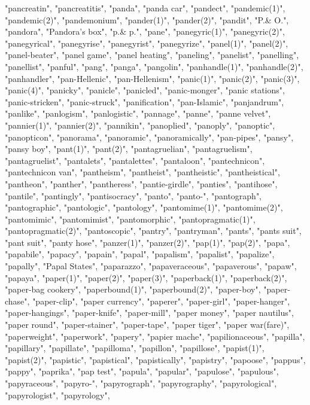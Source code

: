 "pancreatin",
"pancreatitis",
"panda",
"panda car",
"pandect",
"pandemic(1)",
"pandemic(2)",
"pandemonium",
"pander(1)",
"pander(2)",
"pandit",
"P.\& O.",
"pandora",
"Pandora's box",
"p.\& p.",
"pane",
"panegyric(1)",
"panegyric(2)",
"panegyrical",
"panegyrise",
"panegyrist",
"panegyrize",
"panel(1)",
"panel(2)",
"panel-beater",
"panel game",
"panel heating",
"paneling",
"panelist",
"panelling",
"panellist",
"panful",
"pang",
"panga",
"pangolin",
"panhandle(1)",
"panhandle(2)",
"panhandler",
"pan-Hellenic",
"pan-Hellenism",
"panic(1)",
"panic(2)",
"panic(3)",
"panic(4)",
"panicky",
"panicle",
"panicled",
"panic-monger",
"panic stations",
"panic-stricken",
"panic-struck",
"panification",
"pan-Islamic",
"panjandrum",
"panlike",
"panlogism",
"panlogistic",
"pannage",
"panne",
"panne velvet",
"pannier(1)",
"pannier(2)",
"pannikin",
"panoplied",
"panoply",
"panoptic",
"panopticon",
"panorama",
"panoramic",
"panoramically",
"pan-pipes",
"pansy",
"pansy boy",
"pant(1)",
"pant(2)",
"pantagruelian",
"pantagruelism",
"pantagruelist",
"pantalets",
"pantalettes",
"pantaloon",
"pantechnicon",
"pantechnicon van",
"pantheism",
"pantheist",
"pantheistic",
"pantheistical",
"pantheon",
"panther",
"pantheress",
"pantie-girdle",
"panties",
"pantihose",
"pantile",
"pantingly",
"pantisocracy",
"panto",
"panto-",
"pantograph",
"pantographic",
"pantologic",
"pantology",
"pantomime(1)",
"pantomime(2)",
"pantomimic",
"pantomimist",
"pantomorphic",
"pantopragmatic(1)",
"pantopragmatic(2)",
"pantoscopic",
"pantry",
"pantryman",
"pants",
"pants suit",
"pant suit",
"panty hose",
"panzer(1)",
"panzer(2)",
"pap(1)",
"pap(2)",
"papa",
"papabile",
"papacy",
"papain",
"papal",
"papalism",
"papalist",
"papalize",
"papally",
"Papal States",
"paparazzo",
"papaveraceous",
"papaverous",
"papaw",
"papaya",
"paper(1)",
"paper(2)",
"paper(3)",
"paperback(1)",
"paperback(2)",
"paper-bag cookery",
"paperbound(1)",
"paperbound(2)",
"paper-boy",
"paper-chase",
"paper-clip",
"paper currency",
"paperer",
"paper-girl",
"paper-hanger",
"paper-hangings",
"paper-knife",
"paper-mill",
"paper money",
"paper nautilus",
"paper round",
"paper-stainer",
"paper-tape",
"paper tiger",
"paper war(fare)",
"paperweight",
"paperwork",
"papery",
"papier mache",
"papilionaceous",
"papilla",
"papillary",
"papillate",
"papilloma",
"papillon",
"papillose",
"papist(1)",
"papist(2)",
"papistic",
"papistical",
"papistically",
"papistry",
"papoose",
"pappus",
"pappy",
"paprika",
"pap test",
"papula",
"papular",
"papulose",
"papulous",
"papyraceous",
"papyro-",
"papyrograph",
"papyrography",
"papyrological",
"papyrologist",
"papyrology",

